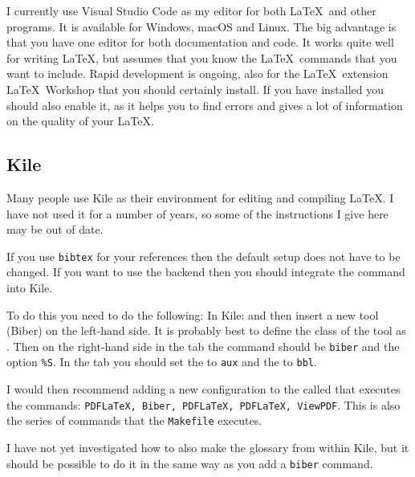 I currently use Visual Studio Code as my editor for both \LaTeX\ and other programs.
It is available for Windows, macOS and Linux.
The big advantage is that you have one editor for both documentation and code.
It works quite well for writing \LaTeX,
but assumes that you know the \LaTeX\ commands that you want to include.
Rapid development is ongoing,
also for the \LaTeX\ extension \textsf{\LaTeX\ Workshop} that you should certainly install.
If you have  installed you should also enable it,
as it helps you to find errors 
and gives a lot of information on the quality of your \LaTeX.


\subsection{Kile}%
\label{sec:app:kubuntu:kile}

Many people use Kile as their environment for editing and compiling \LaTeX. 
I have not used it for a number of years,
so some of the instructions I give here may be out of date.

If you use \texttt{bibtex} for your references then the default
setup does not have to be changed. If you want to use the
 backend then you should integrate the
command into Kile.

To do this you need to do the following:
In Kile:  and
then insert a new tool (Biber) on the left-hand side. It is probably
best to define the class of the tool as \BibTeX. Then on the
right-hand side in the  tab the command should be
\texttt{biber} and the option \texttt{\%S}. In the 
tab you should set the  to \texttt{aux} and
the  to \texttt{bbl}.

I would then recommend adding a new configuration to the
 called  that
executes the commands: \texttt{PDFLaTeX, Biber, PDFLaTeX, PDFLaTeX,
  ViewPDF}. This is also the series of commands that the
\texttt{Makefile} executes.

I have not yet investigated how to also make the glossary from within
Kile, but it should be possible to do it in the same way as you add a
\texttt{biber} command.


